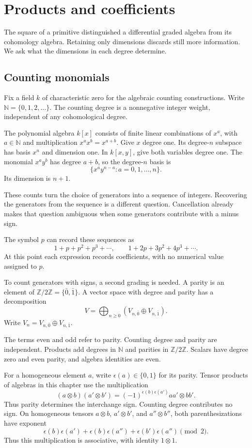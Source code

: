 \chapter{Products and coefficients}
\label{ch:products-coefficients}

The square of a primitive distinguished a differential graded algebra
from its cohomology algebra. Retaining only dimensions discards still
more information. We ask what the dimensions in each degree determine.

\section{Counting monomials}

Fix a field $k$ of characteristic zero for the algebraic counting
constructions. Write $\mathbb N=\{0,1,2,\ldots\}$.
The counting degree is a nonnegative integer weight, independent of any
cohomological degree.

The polynomial algebra $k[x]$ consists of finite linear combinations
of $x^a$, with $a\in\mathbb N$ and multiplication $x^ax^b=x^{a+b}$.
Give $x$ degree one. Its degree-$n$ subspace has basis $x^n$
and dimension one.
In $k[x,y]$, give both variables degree one.
The monomial $x^ay^b$ has degree $a+b$, so the degree-$n$ basis is
\[
 \{x^a y^{n-a}:a=0,1,\ldots,n\}.
\]
Its dimension is $n+1$.

These counts turn the choice of generators into a sequence of integers.
Recovering the generators from the sequence is a different question.
Cancellation already makes that question ambiguous when some generators
contribute with a minus sign.

The symbol $p$ can record these sequences as
\[
 1+p+p^2+p^3+\cdots,
 \qquad
 1+2p+3p^2+4p^3+\cdots.
\]
At this point each expression records coefficients, with no numerical value
assigned to $p$.

To count generators with signs, a second grading is needed.
A parity is an element of $\mathbb Z/2\mathbb Z=\{\bar0,\bar1\}$.
A vector space with degree and parity has a decomposition
\[
 V=\bigoplus_{n\geq0}(V_{n,\bar0}\oplus V_{n,\bar1}).
\]
Write $V_n=V_{n,\bar0}\oplus V_{n,\bar1}$.

The terms even and odd refer to parity. Counting degree and parity are
independent. Products add degrees in $\mathbb N$ and parities in
$\mathbb Z/2\mathbb Z$.
Scalars have degree zero and even parity, and algebra identities are even.

For a homogeneous element $a$, write $\epsilon(a)\in\{0,1\}$ for its
parity. Tensor products of algebras in this chapter use the multiplication
\[
 (a\otimes b)(a'\otimes b')
   =(-1)^{\epsilon(b)\epsilon(a')}aa'\otimes bb'.
\]
Thus parity determines the interchange sign. Counting degree contributes
no sign. On homogeneous tensors $a\otimes b$, $a'\otimes b'$, and
$a''\otimes b''$, both parenthesizations have exponent
\[
 \epsilon(b)\epsilon(a')+
 \epsilon(b)\epsilon(a'')+\epsilon(b')\epsilon(a'')
\pmod 2.
\]
Thus this multiplication is associative, with identity $1\otimes1$.

